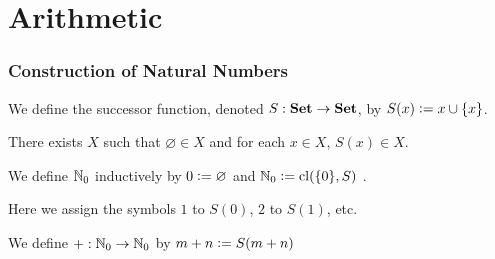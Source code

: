 \documentclass{book}
\begin{document}
	
	
	
	
	
	
	
	
	
	
	
	
	
	
	
	
	
	
	
	
	
	
	
	
	
	
	
	
	
	
	
	
	
	
	
	
	
	
	
	
	
	
	
	
	
	
	\chapter{Arithmetic}
	
	\subsection{Construction of Natural Numbers}
	
	
	
	\begin{defn} 
		We define the successor function, denoted $S: \text{\textbf{Set}} \rightarrow \text{\textbf{Set}}$, by $S(x) \vcentcolon= x \cup \{x\}$. 
	\end{defn}
	
	\begin{ax} 
		There exists $X$ such that $\varnothing \in X$ and for each $x \in X$, $S(x) \in X$. 
	\end{ax}
	
	\begin{defn} 
		We define $\mathbb{N}_0$ inductively by $0 \vcentcolon= \varnothing$ and $\mathbb{N}_0 \vcentcolon= \operatorname{cl}(\{0\}, S)$ . 
	\end{defn}
	
	\begin{note}
		Here we assign the symbols $1$ to $S(0)$, $2$ to $S(1)$, etc. 
	\end{note}
	
	\begin{defn}
		We define $+: \mathbb{N}_0 \rightarrow \mathbb{N}_0$ by $m+n \vcentcolon= S(m+n)$
	\end{defn}
	
\end{document}
